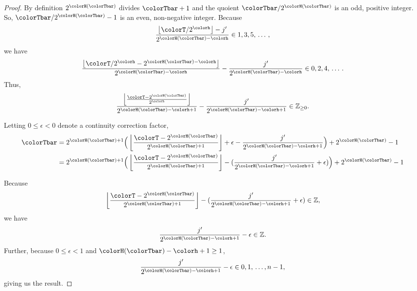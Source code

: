 \begin{proof}
By definition $2^{\colorH(\colorTbar)}$ divides $\colorTbar + 1$ and the quoient $\colorTbar / 2^{\colorH(\colorTbar)}$ is an odd, positive integer.
So, $\colorTbar / 2^{\colorH(\colorTbar)} - 1$ is an even, non-negative integer.
Because
\begin{align*}
\frac{\left\lfloor \colorT / 2^{\colorh} \right\rfloor - j'}{2^{\colorH(\colorTbar) - \colorh}} \in 1, 3, 5, \, \ldots \, ,
\end{align*}
we have
\begin{align*}
\frac{\left\lfloor \colorT / 2^{\colorh} - 2^{\colorH(\colorTbar) - \colorh} \right\rfloor}{2^{\colorH(\colorTbar) - \colorh}}
- \frac{j'}{2^{\colorH(\colorTbar) - \colorh}} \in 0, 2, 4, \, \ldots \, .
\end{align*}
Thus,
\begin{align*}
\frac{
  \left\lfloor
  \frac{\colorT - 2^{\colorH(\colorTbar)}}{2^{\colorh}}
  \right\rfloor
}{
  2^{\colorH(\colorTbar) - \colorh + 1}
}
- \frac{j'}{
  2^{\colorH(\colorTbar) - \colorh + 1}
}
\in \mathbb{Z}_{\geq0}.
\end{align*}

Letting $0 \leq \epsilon < 0$ denote a continuity correction factor,
\begin{align*}
\colorTbar
&= 2^{\colorH(\colorTbar) + 1}
\Big(
\left\lfloor
\frac{
  \colorT - 2^{\colorH(\colorTbar)}
}{
  2^{\colorH(\colorTbar) + 1}
}
\right\rfloor
+ \epsilon
- \frac{j'}{2^{\colorH(\colorTbar) - \colorh + 1}}
\Big)
+ 2^{\colorH(\colorTbar)}
- 1\\
&= 2^{\colorH(\colorTbar) + 1}
\Big(
\left\lfloor
\frac{
  \colorT - 2^{\colorH(\colorTbar)}
}{
  2^{\colorH(\colorTbar) + 1}
}
\right\rfloor
- (
  \frac{j'}{2^{\colorH(\colorTbar) - \colorh + 1}}
  + \epsilon
)
\Big)
+ 2^{\colorH(\colorTbar)}
- 1\\
\end{align*}

Because
\begin{align*}
\left\lfloor
\frac{
  \colorT - 2^{\colorH(\colorTbar)}
}{
  2^{\colorH(\colorTbar) + 1}
}
\right\rfloor
- (
\frac{j'}{2^{\colorH(\colorTbar) - \colorh + 1}}
+ \epsilon
)
\in \mathbb{Z},
\end{align*}
we have
\begin{align*}
\frac{j'}{2^{\colorH(\colorTbar) - \colorh + 1}}
- \epsilon
\in \mathbb{Z}.
\end{align*}
Further, because $0 \leq \epsilon < 1$ and $\colorH(\colorTbar) - \colorh  + 1 \geq 1$,
\begin{align*}
\frac{j'}{2^{\colorH(\colorTbar) - \colorh + 1}}
- \epsilon
\in
0, 1, \,\ldots, n - 1,
\end{align*}
giving us the result.
\end{proof}
